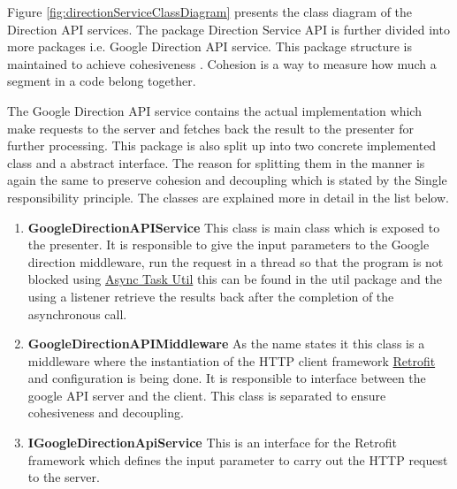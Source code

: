    \par
        Figure \ref{fig:directionServiceClassDiagram} presents the class diagram
        of the Direction API services. The package Direction Service API is further divided 
        into more packages i.e. Google Direction API service. This package 
        structure is maintained to achieve cohesiveness \cite{AdamCarlson}. Cohesion
        is a way to measure how much a segment in a code belong together. 
        
        \par
        The Google Direction API service contains the actual implementation 
        which make requests to the server and fetches back the result to the 
        presenter \cite{mvp} for further processing. This package is also split up into 
        two concrete implemented class and a abstract interface. The reason
        for splitting them in the manner is again the same to preserve cohesion
        and decoupling which is stated by the Single responsibility principle.
        The classes are explained more in detail in the list below. 
        \begin{enumerate}
            \item 
            \textbf{GoogleDirectionAPIService}
                This class is main class which is exposed to the presenter. It is
                responsible to give the input parameters to the Google direction 
                middleware, run the request in a thread so that the program is not
                blocked using \href{https://developer.android.com/reference/android/os/AsyncTask.html}
                {Async Task Util} this can be found in the util package and the using a listener
                retrieve the results back after the completion of the asynchronous call.
            \item 
            \textbf{GoogleDirectionAPIMiddleware}
                As the name states it this class is a middleware where the instantiation
                of the HTTP client framework \href{http://square.github.io/retrofit/} 
                {Retrofit} and configuration is being done. It is responsible
                to interface between the google API server and the client.
                This class is separated to ensure cohesiveness and decoupling.
            \item 
            \textbf{IGoogleDirectionApiService}
                This is an interface for the Retrofit framework which defines the input
                parameter to carry out the HTTP request to the server.
        \end{enumerate} 

